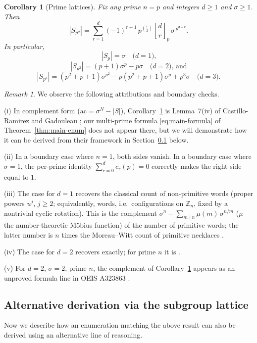 \documentclass[11pt,a4paper]{article}
\newtheorem{corollary}[theorem]{Corollary}
\theoremstyle{remark}
\newtheorem{remark}[theorem]{Remark}
\newcommand{\ZZ}{\mathbb{Z}}
\newcommand{\gaussbinom}[2]{\genfrac{[}{]}{0pt}{}{#1}{#2}}
\begin{document}
\begin{corollary}[Prime lattices]\label{cor:prime}
Fix any prime $n=p$ and integers $d\ge1$ and $\sigma\ge1$. Then
\[|S_{p^d}| = \sum_{r=1}^{d}(-1)^{r+1}\,p^{\binom r2}\gaussbinom dr_p\,
\sigma^{\,p^{d-r}}.\] In particular, 
\[|S_p|=\sigma \quad \mbox{($d=1$),}\]
\[|S_{p^2}|=(p{+}1)\sigma^p-p\sigma \quad \mbox{($d=2$), and}\]
\[|S_{p^3}|=(p^2{+}p{+}1)\sigma^{p^2}-p(p^2{+}p{+}1)\sigma^{p}
+p^3\sigma \quad \mbox{($d=3$).}\]
\end{corollary}

\begin{remark}\label{rem:boundary} We observe the following attributions and boundary checks.

(i) In complement form ($\mathrm{ac}=\sigma^N-|S|$),
Corollary~\ref{cor:prime} is Lemma~7(iv) of Castillo-Ramirez and Gadouleau
\cite{cg2017}; our multi-prime formula \eqref{eq:main-formula} of Theorem~\ref{thm:main-enum} does not
appear there, but we will demonstrate how it can be derived from their framework in
Section~\ref{sec:second-derivation} below.

(ii) In a boundary case where $n=1$, both sides vanish. In a boundary case where $\sigma=1$, the per-prime identity $\sum_{r=0}^d c_r(p)=0$ correctly makes the right side equal to $1$. 

(iii) The case for $d=1$ recovers the classical
count of non-primitive words (proper powers $u^j$, $j\ge2$; equivalently,
words, i.e.\ configurations on $\ZZ_n$, fixed by a nontrivial cyclic
rotation). This is the complement $\sigma^n-\sum_{m\mid n}\mu(m)\,\sigma^{n/m}$
($\mu$ the number-theoretic M\"obius function) of the number of
primitive words; the latter number is $n$ times the Moreau--Witt count of
primitive necklaces \cite{moreau1872,witt1937}.

(iv) The case for $d=2$
recovers \cite[Thm.~E.19]{banda2019} exactly; for prime $n$ it is
\cite[Cor.~E.20]{banda2019}.

(v) For $d=2$, $\sigma=2$, prime $n$, the complement of
Corollary~\ref{cor:prime} appears as an unproved formula line in OEIS
A323863 \cite{oeisA323863}.
\end{remark}

\subsection{Alternative derivation via the subgroup lattice}
\label{sec:second-derivation}

Now we describe how an enumeration matching the above result can also be derived using an alternative line of reasoning.
\end{document}
